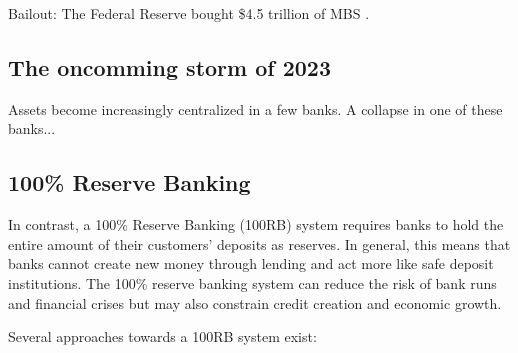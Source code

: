 Bailout: The Federal Reserve bought \$4.5 trillion of MBS \cite{MBSInvestopedia}.


\subsection{The oncomming storm of 2023}
Assets become increasingly centralized in a few banks. A collapse in one of these banks...

\subsection{100\% Reserve Banking}
In contrast, a 100\% Reserve Banking (100RB) system requires banks to hold the entire amount of their customers' deposits as reserves. In general, this means that banks cannot create new money through lending and act more like safe deposit institutions. The 100\% reserve banking system can reduce the risk of bank runs and financial crises but may also constrain credit creation and economic growth.

Several approaches towards a 100RB system exist:

